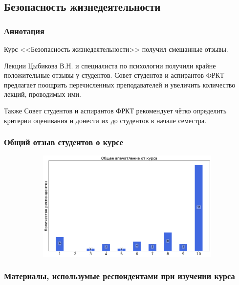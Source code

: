 \subsection{Безопасность жизнедеятельности}
	
	\subsubsection{Аннотация}

		Курс <<Безопасность жизнедеятельности>> получил смешанные отзывы.

		Лекции Цыбикова В.Н. и специалиста по психологии получили крайне положительные отзывы у студентов. Совет студентов и аспирантов ФРКТ предлагает поощрить перечисленных преподавателей и увеличить количество лекций, проводимых ими.

		Также Совет студентов и аспирантов ФРКТ рекомендует чётко определить критерии оценивания и донести их до студентов в начале семестра.

	\subsubsection{Общий отзыв студентов о курсе}

		\begin{figure}[H]
			\centering
			\begin{subfigure}[b]{0.45\textwidth}
				\centering
				\includegraphics[width=\textwidth]{images/1 course/БЖД/general-0.png}
			\end{subfigure}
		\end{figure}

	\subsubsection{Материалы, использумые респондентами при изучении курса}

